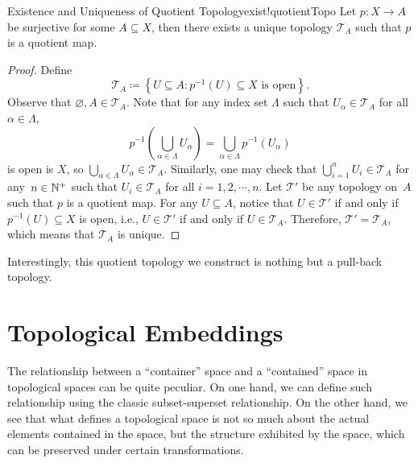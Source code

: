 \documentclass[math]{amznotes}
\theoremstyle{remark}
\begin{document}
\begin{probox}{Existence and Uniqueness of Quotient Topology}{exist!quotientTopo}
    Let $p \colon X \to A$ be surjective for some $A \subseteq X$, then there exists a unique topology $\mathcal{T}_A$ such that $p$ is a quotient map.
    \tcblower
    \begin{proof}
        Define 
        \begin{equation*}
            \mathcal{T}_A \coloneqq \left\{U \subseteq A \colon p^{-1}\left(U\right) \subseteq X \textrm{ is open}\right\}.
        \end{equation*}
        Observe that $\varnothing, A \in \mathcal{T}_A$. Note that for any index set $\Lambda$ such that $U_{\alpha} \in \mathcal{T}_A$ for all $\alpha \in \Lambda$,
        \begin{equation*}
            p^{-1}\left(\bigcup_{\alpha \in \Lambda}U_{\alpha}\right) = \bigcup_{\alpha \in \Lambda}p^{-1}\left(U_{\alpha}\right)
        \end{equation*}
        is open is $X$, so $\bigcup_{\alpha \in \Lambda}U_{\alpha} \in \mathcal{T}_A$. Similarly, one may check that $\bigcup_{i = 1}^nU_{i} \in \mathcal{T}_A$ for any~$n \in \mathbb{N}^+$ such that $U_i \in \mathcal{T}_A$ for all $i = 1, 2, \cdots, n$. Let $\mathcal{T}'$ be any topology on~$A$ such that $p$ is a quotient map. For any $U \subseteq A$, notice that $U \in \mathcal{T}'$ if and only if~$p^{-1}\left(U\right) \subseteq X$ is open, i.e., $U \in \mathcal{T}'$ if and only if $U \in \mathcal{T}_A$. Therefore, $\mathcal{T}' = \mathcal{T}_A$, which means that $\mathcal{T}_A$ is unique.
    \end{proof}
\end{probox}
Interestingly, this quotient topology we construct is nothing but a pull-back topology.
\section{Topological Embeddings}
The relationship between a ``container'' space and a ``contained'' space in topological spaces can be quite peculiar. On one hand, we can define such relationship using the classic subset-superset relationship. On the other hand, we see that what defines a topological space is not so much about the actual elements contained in the space, but the structure exhibited by the space, which can be preserved under certain transformations.
\end{document}
